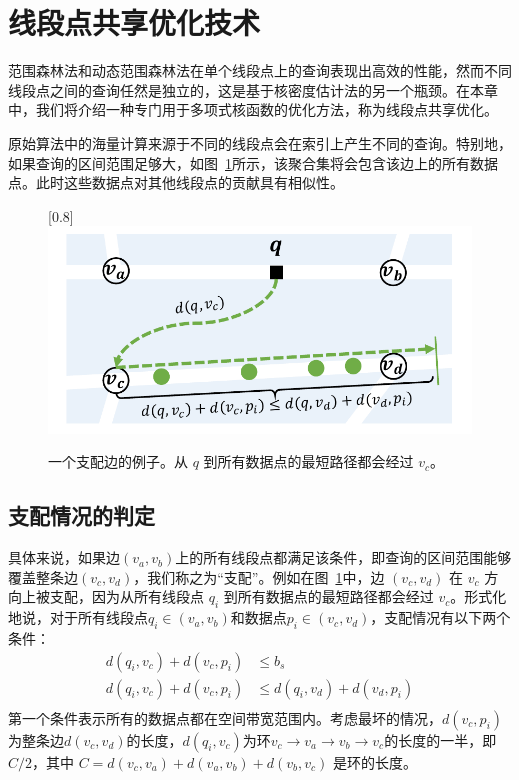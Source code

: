 \section{线段点共享优化技术}
\label{sec6:LixelsAggregaion}

范围森林法和动态范围森林法在单个线段点上的查询表现出高效的性能，然而不同线段点之间的查询任然是独立的，这是基于核密度估计法的另一个瓶颈。在本章中，我们将介绍一种专门用于多项式核函数的优化方法，称为线段点共享优化。

原始算法中的海量计算来源于不同的线段点会在索引上产生不同的查询。特别地，如果查询的区间范围足够大，如图~\ref{fig:LS_1}所示，该聚合集将会包含该边上的所有数据点。此时这些数据点对其他线段点的贡献具有相似性。

\begin{figure}[h]\centering
    \scalebox{0.8}[0.8]{\includegraphics{./figures/LS_1.pdf}}
    \caption{一个支配边的例子。从 $q$ 到所有数据点的最短路径都会经过 $v_c$。}
    \label{fig:LS_1}
\end{figure}

\subsection{支配情况的判定}

具体来说，如果边$(v_a, v_b)$上的所有线段点都满足该条件，即查询的区间范围能够覆盖整条边$(v_c, v_d)$，我们称之为“支配”。例如在图~\ref{fig:LS_1}中，边 $(v_c, v_d)$ 在 $v_c$ 方向上被支配，因为从所有线段点 $q_i$ 到所有数据点的最短路径都会经过 $v_c$。形式化地说，对于所有线段点$q_i \in (v_a, v_b)$和数据点$p_i \in (v_c, v_d)$，支配情况有以下两个条件：
\begin{equation*}
\begin{aligned}
    d(q_i, v_c) + d(v_c, p_i) &\le b_s \\
    d(q_i, v_c) + d(v_c, p_i) &\le d(q_i, v_d) + d(v_d, p_i) \\
\end{aligned}
\end{equation*}
第一个条件表示所有的数据点都在空间带宽范围内。考虑最坏的情况，$d(v_c, p_i)$为整条边$d(v_c, v_d)$的长度，$d(q_i, v_c)$为环$v_c {\rightarrow} v_a {\rightarrow} v_b {\rightarrow} v_c$的长度的一半，即$C / 2$，其中 $C = d(v_c, v_a) + d(v_a, v_b) + d(v_b, v_c)$ 是环的长度。

